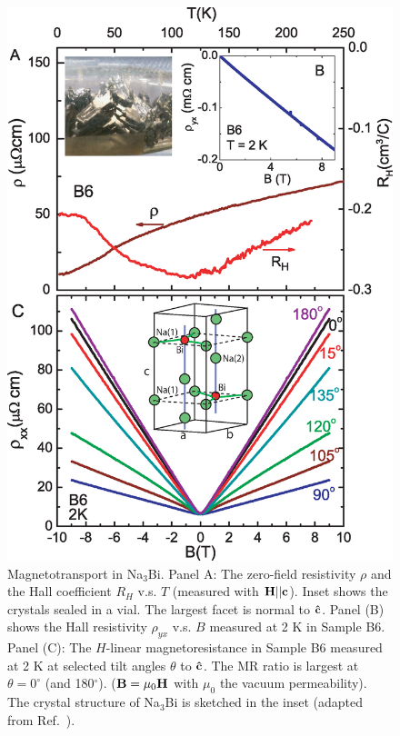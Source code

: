 \begin{figure}[!htbp]
  \begin{center}
\includegraphics[width=0.8\linewidth]{ch-na3bi/figures/FigRMRA}
\caption{\label{figR}
Magnetotransport in Na$_3$Bi. Panel A: The zero-field resistivity $\rho$ and the Hall coefficient $R_H$ v.s. $T$ (measured with $\bf H||c$). Inset shows the crystals sealed in a vial. The largest facet is normal to $\bf\hat{c}$. Panel (B) shows the Hall resistivity $\rho_{yx}$ v.s. $B$ measured at 2 K in Sample B6.
Panel (C): The $H$-linear magnetoresistance in Sample B6 measured at 2 K at selected tilt angles $\theta$ to $\bf\hat{c}$. The MR ratio is largest at $\theta=0^\circ$ (and 180$^\circ$). (${\bf B} = \mu_0 {\bf H}$ with $\mu_0$ the vacuum permeability). The crystal structure of Na$_3$Bi is sketched in the inset (adapted from Ref.~\cite{Liu2014a}). 
}
  \end{center}
\end{figure}

